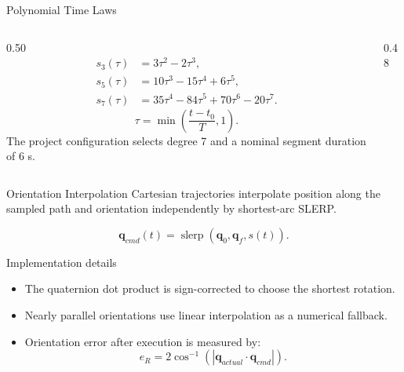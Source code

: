 \documentclass[10pt,aspectratio=169]{beamer}
\newcommand{\quat}{\mathbf{q}}
\begin{document}
\begin{frame}{Polynomial Time Laws}
  \begin{columns}[T]
    \begin{column}{0.50\textwidth}
      \begin{align*}
        s_3(\tau) &= 3\tau^2 - 2\tau^3,\\
        s_5(\tau) &= 10\tau^3 - 15\tau^4 + 6\tau^5,\\
        s_7(\tau) &= 35\tau^4 - 84\tau^5 + 70\tau^6 - 20\tau^7.
      \end{align*}
      \[
        \tau = \min\left(\frac{t-t_0}{T},1\right).
      \]
      The project configuration selects degree 7 and a nominal segment duration of 6 s.
    \end{column}
    \begin{column}{0.48\textwidth}
      \centering
    \end{column}
  \end{columns}
\end{frame}

\begin{frame}{Orientation Interpolation}
  Cartesian trajectories interpolate position along the sampled path and orientation independently by shortest-arc SLERP.

  \[
    \quat_{cmd}(t) =
    \operatorname{slerp}\left(\quat_0,\quat_f,s(t)\right).
  \]

  \begin{block}{Implementation details}
    \begin{itemize}
      \item The quaternion dot product is sign-corrected to choose the shortest rotation.
      \item Nearly parallel orientations use linear interpolation as a numerical fallback.
      \item Orientation error after execution is measured by:
      \[
        e_R = 2\cos^{-1}\left(|\quat_{actual}\cdot\quat_{cmd}|\right).
      \]
    \end{itemize}
  \end{block}
\end{frame}
\end{document}
